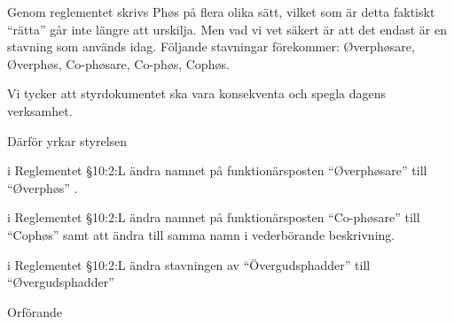 \documentclass[../_main/handlingar.tex]{subfiles}
\begin{document}

Genom reglementet skrivs Phøs på flera olika sätt, vilket som är detta faktiskt “rätta” går inte längre att urskilja. Men vad vi vet säkert är att det endast är en stavning som används idag. Följande stavningar förekommer: Øverphøsare, Øverphøs, Co-phøsare, Co-phøs, Cophøs. 

Vi tycker att styrdokumentet ska vara konsekventa och spegla dagens verksamhet. 

Därför yrkar styrelsen

\begin{attsatser}
    \att i Reglementet \S10:2:L ändra namnet på funktionärsposten “Øverphøsare” till “Øverphøs” .

    \att i Reglementet \S10:2:L ändra namnet på funktionärsposten  “Co-phøsare” till “Cophøs” samt att ändra till samma namn i vederbörande beskrivning. 

    \att i Reglementet \S10:2:L ändra stavningen av “Övergudsphadder” till “Øvergudsphadder”


\end{attsatser}

\begin{signatures}{1}
    \ist
    \signature{\ordf}{Orförande}
\end{signatures}
\end{document}
